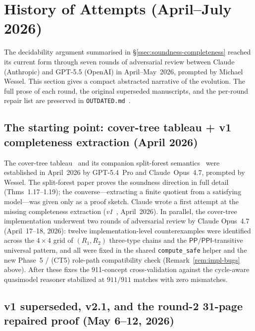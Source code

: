 \documentclass[
]{ceurart}
\theoremstyle{definition}
\newcommand{\PP}{\ensuremath{\mathsf{PP}}}
\newcommand{\PPI}{\ensuremath{\mathsf{PPI}}}
\begin{document}
\section{History of Attempts (April--July 2026)}
\label{sec:history-of-attempts}

The decidability argument summarised in
\S\ref{ssec:soundness-completeness} reached its current form
through seven rounds of adversarial review between Claude
(Anthropic) and GPT-5.5 (OpenAI) in April--May~2026, prompted by
Michael Wessel.  This section gives a compact abstracted
narrative of the evolution.  The full prose of each round, the
original superseded manuscripts, and the per-round repair list
are preserved in
\texttt{OUTDATED.md}~\cite{ALCIRCC5Outdated}.

\subsection{The starting point: cover-tree tableau + v1
completeness extraction (April 2026)}

The cover-tree tableau~\cite{CoverTree,CoverTreeImpl} and its
companion split-forest semantics~\cite{SiblingCompleted} were
established in April~2026 by GPT-5.4~Pro and
Claude~Opus~4.7, prompted by Wessel.  The split-forest paper
proves the soundness direction in full detail (Thms~1.17--1.19);
the converse---extracting a finite quotient from a satisfying
model---was given only as a proof sketch.  Claude wrote a first
attempt at the missing completeness extraction
(\textit{v1}~\cite{CompletenessExtractionV1}, April~2026).  In
parallel, the cover-tree implementation underwent two rounds of
adversarial review by Claude Opus~4.7 (April~17--18, 2026):
twelve implementation-level counterexamples were identified
across the $4\times 4$ grid of $(R_1,R_2)$ three-type chains
and the $\PP/\PPI$-transitive universal pattern, and all were
fixed in the shared \texttt{compute\_safe} helper and the new
Phase~5 / (CT5) role-path compatibility check
(Remark~\ref{rem:impl-bugs} above).  After these fixes the
911-concept cross-validation against the cycle-aware quasimodel
reasoner stabilized at $911/911$ matches with zero mismatches.

\subsection{v1 superseded, v2.1, and the round-2 31-page repaired
proof (May 6--12, 2026)}
\end{document}
